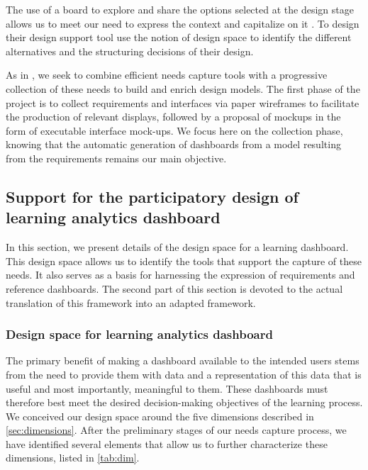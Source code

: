 \documentclass[preprint,12pt]{elsarticle}
\begin{document}
The use of a board to explore and share the options selected at the design stage allows us to meet our need to express the context and capitalize on it \cite{osterwalder2010business}. To design their design support tool \citet{hallifax2018design} use the notion of design space \cite{shaw2011role} to identify the different alternatives and the structuring decisions of their design. 

As in \cite{rivero2014mockup}, we seek to combine efficient needs capture tools with a progressive collection of these needs to build and enrich design models. The first phase of the project is to collect requirements and interfaces via paper wireframes to facilitate the production of relevant displays, followed by a proposal of mockups in the form of executable interface mock-ups. We focus here on the collection phase, knowing that the automatic generation of dashboards from a model resulting from the requirements remains our main objective.

\subsection{Support for the participatory design of learning analytics dashboard}
In this section, we present details of the design space for a learning dashboard. This design space allows us to identify the tools that support the capture of these needs. It also serves as a basis for harnessing the expression of requirements and reference dashboards. The second part of this section is devoted to the actual translation of this framework into an adapted framework.
\subsubsection{Design space for learning analytics dashboard}
The primary benefit of making a dashboard available to the intended users stems from the need to provide them with data and a representation of this data that is useful and most importantly, meaningful to them. These dashboards must therefore best meet the desired decision-making objectives of the learning process. We conceived our design space around the five dimensions described in \ref{sec:dimensions}. After the preliminary stages of our needs capture process, we have identified several elements that allow us to further characterize these dimensions, listed in \ref{tab:dim}.
\end{document}
